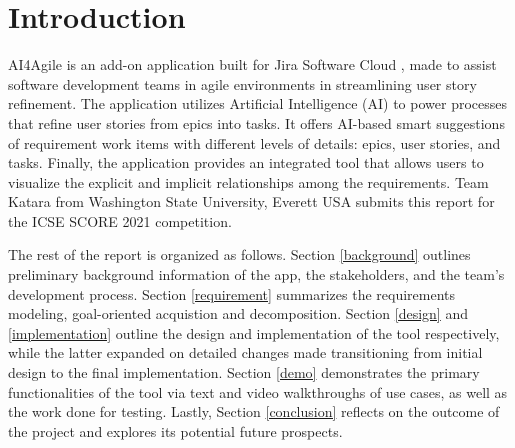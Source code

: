 \section{Introduction}
AI4Agile is an add-on application built for Jira Software Cloud \cite{jira2}, made to assist software development teams in agile environments in streamlining user story refinement. The application utilizes Artificial Intelligence (AI) to power processes that refine user stories from epics into tasks. It offers AI-based smart suggestions of requirement work items with different levels of details: epics, user stories, and tasks. Finally, the application provides an integrated tool that allows users to visualize the explicit and implicit relationships among the requirements. Team Katara from Washington State University, Everett USA submits this report for the ICSE SCORE 2021 competition. 

The rest of the report is organized as follows. Section \ref{background} outlines preliminary background information of the app, the stakeholders, and the team's development process. Section \ref{requirement} summarizes the requirements modeling, goal-oriented acquistion and decomposition. Section \ref{design} and \ref{implementation} outline the design and implementation of the tool respectively, while the latter expanded on detailed changes made transitioning from initial design to the final implementation. Section \ref{demo} demonstrates the primary functionalities of the tool via text and video walkthroughs of use cases, as well as the work done for testing. Lastly, Section \ref{conclusion} reflects on the outcome of the project and explores its potential future prospects. 
